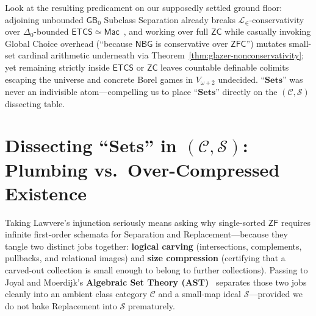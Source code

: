 Look at the resulting predicament on our supposedly settled ground floor: adjoining unbounded $\mathsf{GB}_0$ Subclass Separation already breaks $\mathcal{L}_\in$-conservativity over $\Delta_0$-bounded $\mathsf{ETCS} \simeq \mathsf{Mac}$~\cite{Mathias01}, and working over full $\mathsf{ZC}$ while casually invoking Global Choice overhead (``because $\mathsf{NBG}$ is conservative over $\mathsf{ZFC}$'') mutates small-set cardinal arithmetic underneath via Theorem~\ref{thm:glazer-nonconservativity}; yet remaining strictly inside $\mathsf{ETCS}$ or $\mathsf{ZC}$ leaves countable definable colimits escaping the universe and concrete Borel games in $V_{\omega+2}$ undecided. ``$\mathbf{Sets}$'' was never an indivisible atom---compelling us to place ``$\mathbf{Sets}$'' directly on the $(\mathcal{C}, \mathcal{S})$ dissecting table.

\section{Dissecting ``$\mathbf{Sets}$'' in $(\mathcal{C}, \mathcal{S})$: Plumbing vs.\ Over-Compressed Existence}\label{sec:ast-plumbing-compression}

Taking Lawvere's injunction seriously means asking why single-sorted $\mathsf{ZF}$ requires infinite first-order schemata for Separation and Replacement---because they tangle two distinct jobs together: \textbf{logical carving} (intersections, complements, pullbacks, and relational images) and \textbf{size compression} (certifying that a carved-out collection is small enough to belong to further collections). Passing to Joyal and Moerdijk's \textbf{Algebraic Set Theory (AST)}~\cite{JoyalMoerdijk95} separates those two jobs cleanly into an ambient class category $\mathcal{C}$ and a small-map ideal $\mathcal{S}$---provided we do not bake Replacement into $\mathcal{S}$ prematurely.

